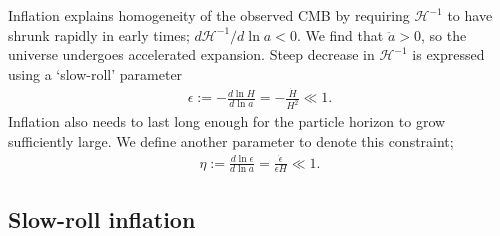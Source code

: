 Inflation explains homogeneity of the observed CMB by requiring $\mathcal{H}^{-1}$ to have shrunk rapidly in early times; $d\mathcal{H}^{-1}/d\ln a < 0$. We find that $\ddot{a} > 0$, so the universe undergoes accelerated expansion. Steep decrease in $\mathcal{H}^{-1}$ is expressed using a `slow-roll' parameter
\begin{align}
	\epsilon := - \frac{d\ln H}{d\ln a} = -\frac{\dot{H}}{H^2} \ll 1. \label{def:slow_roll_epsilon}
\end{align}
Inflation also needs to last long enough for the particle horizon to grow sufficiently large. We define another parameter to denote this constraint;
\begin{align}
	\eta := \frac{d\ln \epsilon}{d\ln a} = \frac{\dot{\epsilon}}{\epsilon H} \ll 1. \label{def:slow_roll_eta}
\end{align}


\subsection{Slow-roll inflation}
\label{section:slow-roll_inflation}

